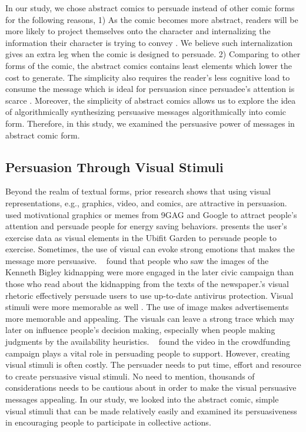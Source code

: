 In our study, we chose abstract comics to persuade instead of other comic forms for the following reasons, 1) As the comic becomes more abstract, readers will be more likely to project themselves onto the character and internalizing the information their character is trying to convey \textcite{scott1993understanding}. We believe such internalization gives an extra leg when the comic is designed to persuade. 2) Comparing to other forms of the comic, the abstract comics contains least elements which lower the cost to generate. The simplicity also requires the reader's less cognitive load to consume the message which is ideal for persuasion since persuadee's attention is scarce \cite{Janssen2016}. Moreover, the simplicity of abstract comics allows us to explore the idea of algorithmically synthesizing persuasive messages algorithmically into comic form. Therefore, in this study, we examined the persuasive power of messages in abstract comic form.

\subsection{Persuasion Through Visual Stimuli}
Beyond the realm of textual forms, prior research shows that using visual representations, e.g., graphics, video, and comics, are attractive in persuasion. ~\textcite{selker2015sweetbuildinggreeter} used motivational graphics or memes from 9GAG and Google to attract people's attention and persuade people for energy saving behaviors. \textcite{consolvo2008activity} presents the user's exercise data as visual elements in the Ubifit Garden to persuade people to exercise. Sometimes, the use of visual can evoke strong emotions that makes the message more persuasive. ~\textcite{iyer2006picture} found that people who saw the images of the Kenneth Bigley kidnapping were more engaged in the later civic campaign than those who read about the kidnapping from the texts of the newspaper.\textcite{zhang2014stop}'s visual rhetoric effectively persuade users to use up-to-date antivirus protection. Visual stimuli were more memorable as well \cite{nisbett1980human}. The use of image makes advertisements more memorable and appealing. The visuals can leave a strong trace which may later on influence people's decision making, especially when people making judgments by the availability heuristics. ~\textcite{dey2017art} found the video in the crowdfunding campaign plays a vital role in persuading people to support. However, creating visual stimuli is often costly. The persuader needs to put time, effort and resource to create persuasive visual stimuli. No need to mention, thousands of considerations needs to be cautious about in order to make the visual persuasive messages appealing. In our study, we looked into the abstract comic, simple visual stimuli that can be made relatively easily and examined its persuasiveness in encouraging people to participate in collective actions. 

